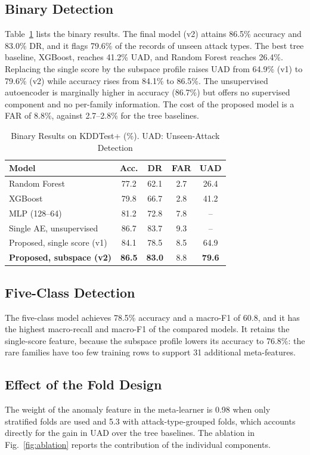 \documentclass[journal]{IEEEtran}
\begin{document}
\subsection{Binary Detection}
Table~\ref{tab:binary} lists the binary results. The final model (v2) attains 86.5\% accuracy and 83.0\% DR, and it flags 79.6\% of the records of unseen attack types. The best tree baseline, XGBoost, reaches 41.2\% UAD, and Random Forest reaches 26.4\%. Replacing the single score by the subspace profile raises UAD from 64.9\% (v1) to 79.6\% (v2) while accuracy rises from 84.1\% to 86.5\%. The unsupervised autoencoder is marginally higher in accuracy (86.7\%) but offers no supervised component and no per-family information. The cost of the proposed model is a FAR of 8.8\%, against 2.7--2.8\% for the tree baselines.

\begin{table}[!t]
\centering
\caption{Binary Results on KDDTest+ (\%). UAD: Unseen-Attack Detection}
\label{tab:binary}
\footnotesize
\begin{tabular}{lcccc}
\toprule
Model & Acc. & DR & FAR & UAD \\
\midrule
Random Forest & 77.2 & 62.1 & 2.7 & 26.4 \\
XGBoost & 79.8 & 66.7 & 2.8 & 41.2 \\
MLP (128--64) & 81.2 & 72.8 & 7.8 & -- \\
Single AE, unsupervised & 86.7 & 83.7 & 9.3 & -- \\
Proposed, single score (v1) & 84.1 & 78.5 & 8.5 & 64.9 \\
\textbf{Proposed, subspace (v2)} & \textbf{86.5} & \textbf{83.0} & 8.8 & \textbf{79.6} \\
\bottomrule
\end{tabular}
\end{table}

\subsection{Five-Class Detection}
The five-class model achieves 78.5\% accuracy and a macro-F1 of 60.8, and it has the highest macro-recall and macro-F1 of the compared models. It retains the single-score feature, because the subspace profile lowers its accuracy to 76.8\%: the rare families have too few training rows to support 31 additional meta-features.

\subsection{Effect of the Fold Design}
The weight of the anomaly feature in the meta-learner is 0.98 when only stratified folds are used and 5.3 with attack-type-grouped folds, which accounts directly for the gain in UAD over the tree baselines. The ablation in Fig.~\ref{fig:ablation} reports the contribution of the individual components.
\end{document}
